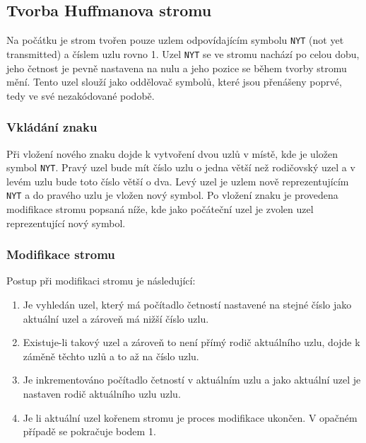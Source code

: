 \documentclass[12pt,a4paper,titlepage,final]{article}
\begin{document}
	\subsection{Tvorba Huffmanova stromu}
	Na počátku je strom tvořen pouze uzlem odpovídajícím symbolu \texttt{NYT} (not yet transmitted) a číslem uzlu rovno 1.
	Uzel \texttt{NYT} se ve stromu nachází po celou dobu, jeho četnost je pevně nastavena na nulu a jeho pozice
	se během tvorby stromu mění. Tento uzel slouží jako oddělovač symbolů, které jsou přenášeny poprvé, tedy ve své nezakódované podobě.

		\subsubsection{Vkládání znaku}
		Při vložení nového znaku dojde k vytvoření dvou uzlů v místě, kde je uložen symbol \texttt{NYT}. 
		Pravý uzel bude mít číslo uzlu o jedna větší než rodičovský uzel a v levém uzlu bude toto číslo větší o dva.
		Levý uzel je uzlem nově reprezentujícím \texttt{NYT} a do pravého uzlu je vložen nový symbol.
		Po vložení znaku je provedena modifikace stromu popsaná níže, kde jako počáteční uzel je zvolen uzel reprezentující nový symbol.

		\subsubsection{Modifikace stromu}
		Postup při modifikaci stromu je následující:
			\begin{enumerate}
				\item Je vyhledán uzel, který má počítadlo četností nastavené na stejné číslo jako aktuální uzel a zároveň má nižší číslo uzlu.
				\item Existuje-li takový uzel a zároveň to není přímý rodič aktuálního uzlu, dojde k záměně těchto uzlů a to až na číslo uzlu.
				\item Je inkrementováno počítadlo četností v aktuálním uzlu a jako aktuální uzel je nastaven rodič aktuálního uzlu uzlu.
				\item Je li aktuální uzel kořenem stromu je proces modifikace ukončen. V opačném případě se pokračuje bodem 1.
			\end{enumerate}
\end{document}
